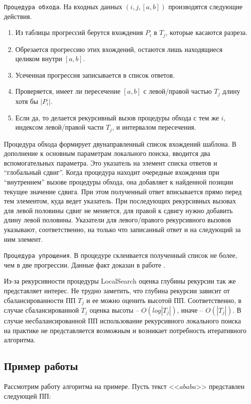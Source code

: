 \documentclass[14pt]{article}
\begin{document}
\texttt{Процедура обхода}. На входных данных $(i, j, [a, b])$ производятся следующие действия.
\begin{enumerate}

\item Из таблицы прогрессий берутся вхождения $P_i$ в $T_j$, которые касаются
разреза.
\item Обрезается прогрессию этих вхождений, остаются лишь находящиеся
целиком внутри $[a, b]$.
\item Усеченная прогрессия записывается в список ответов.
\item Проверяется, имеет ли пересечение $[a, b]$ с левой/правой частью $T_j$
длину хотя бы $|P_i|$.
\item Если да, то делается рекурсивный вызов процедуры обхода с тем же $i$, индексом левой/правой части $T_j$, и интервалом пересечения.
\end{enumerate}
Процедура обхода формирует двунаправленный список вхождений шаблона. В дополнение к основным параметрам локального поиска, вводится два вспомогательных параметра. Это указатель на элемент списка ответов и “глобальный сдвиг”. Когда процедура находит очередные вхождения при “внутреннем” вызове процедуры обхода, она добавляет к найденной позиции текущее значение сдвига. При этом полученный ответ вписывается прямо перед тем элементом, куда ведет указатель. При последующих рекурсивных вызовах для левой половины сдвиг не меняется, для правой к сдвигу нужно добавить длину левой половины. Указатели для левого/правого рекурсивного вызовов указывают, соответственно, на только что записанный ответ и на следующий за ним элемент.

\texttt{Процедура упрощения}. В процедуре склеивается полученный список не более, чем в две прогрессии. Данные факт доказан в работе \cite{Lifshits}.

Из-за рекурсивности процедуры LocalSearch оценка глубины рекурсии так же представляет интерес. Не трудно заметить, что глубина рекурсии зависит от сбалансированности ПП $T_j$ и ее можно оценить высотой ПП. Соответственно, в случае сбалансированной $T_j$ оценка высоты -- $O(log|T_j|)$, иначе -- $O(|T_j|)$. В случае несбалансированной ПП использование рекурсивного локального поиска на практике не представляется возможным и возникает потребность итеративного алгоритма.
\subsection{Пример работы}

Рассмотрим работу алгоритма на примере. Пусть текст <<$ababa$>> представлен следующей ПП:
\end{document}
